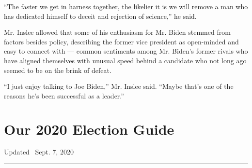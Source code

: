 ``The faster we get in harness together, the likelier it is we will
remove a man who has dedicated himself to deceit and rejection of
science,'' he said.

Mr. Inslee allowed that some of his enthusiasm for Mr. Biden stemmed
from factors besides policy, describing the former vice president as
open-minded and easy to connect with --- common sentiments among Mr.
Biden's former rivals who have aligned themselves with unusual speed
behind a candidate who not long ago seemed to be on the brink of defeat.

``I just enjoy talking to Joe Biden,'' Mr. Inslee said. ``Maybe that's
one of the reasons he's been successful as a leader.''

\hypertarget{our-2020-election-guide}{%
\section{Our 2020 Election Guide}\label{our-2020-election-guide}}

Updated ~Sept. 7, 2020

\begin{center}\rule{0.5\linewidth}{\linethickness}\end{center}

